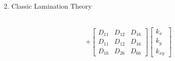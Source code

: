 \documentclass{beamer}
\begin{document}
\begin{frame}{2. Classic Lamination Theory}
\begin{columns}[c]
\begin{column}{0.5\textwidth}
\begin{equation}
\begin{array}{l}
\begin{aligned}
		&+  
		\begin{bmatrix}
			D_{11} & D_{12} & D_{16} \\
			D_{11} & D_{12} & D_{16} \\
			D_{16} & D_{26} & D_{66} 
		\end{bmatrix}
		\begin{bmatrix}
			k_x \\
			k_y \\
			k_{xy} 
		\end{bmatrix}
	\end{aligned}
		\end{array}
	\end{equation}
	\end{column}
\end{columns}
\end{frame}
\end{document}
